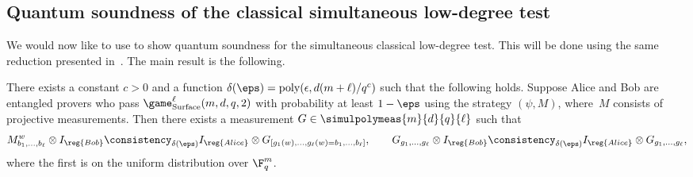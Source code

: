\subsection{Quantum soundness of the classical simultaneous low-degree test}\label{sec:q-simultaneous}

We would now like to use 
to show quantum soundness for the simultaneous classical low-degree test.
This will be done using the same reduction presented in~.
The main result is the following.

\begin{theorem}
  \label{thm:simultaneous-ldt}
There exists a constant $c > 0$ and a function $\delta(\eps) = \mathrm{poly}(\epsilon, d (m + \ell)/q^c)$ such that the following holds.
Suppose Alice and Bob are entangled provers who pass $\game_{\mathrm{Surface}}^\ell(m,d,q,2)$ with probability at least $1-\eps$
using the strategy $(\psi, M)$, where~$M$ consists of projective measurements.
Then there exists a measurement $G \in \simulpolymeas{m}{d}{q}{\ell}$ such that
\begin{equation*}
M^w_{b_1, \ldots, b_\ell} \otimes I_{\reg{Bob}} \consistency_{\delta(\eps)} I_{\reg{Alice}} \otimes G_{[g_1(w), \ldots, g_\ell(w) = b_1, \ldots, b_\ell]},
\qquad
G_{g_1, \ldots, g_\ell} \otimes I_{\reg{Bob}}
\consistency_{\delta(\eps)}
I_{\reg{Alice}} \otimes G_{g_1, \ldots, g_\ell},
\end{equation*}
where the first is on the uniform distribution over $\F_q^m$.
\end{theorem}

